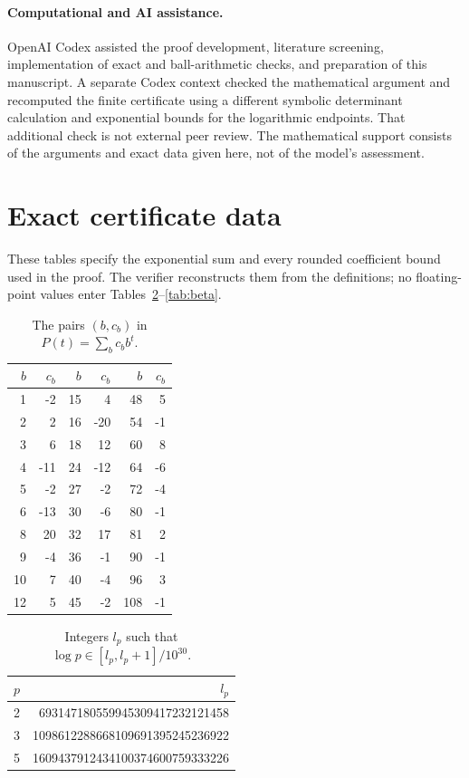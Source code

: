 \documentclass[11pt]{article}
\begin{document}
\paragraph{Computational and AI assistance.}
OpenAI Codex assisted the proof development, literature screening,
implementation of exact and ball-arithmetic checks, and preparation of
this manuscript. A separate Codex context checked the mathematical
argument and recomputed the finite certificate using a different
symbolic determinant calculation and exponential bounds for the
logarithmic endpoints. That additional check is not external peer
review. The mathematical support consists of the arguments and exact
data given here, not of the model's assessment.

\appendix
\section{Exact certificate data}\label{app:data}

These tables specify the exponential sum and every rounded coefficient
bound used in the proof. The verifier reconstructs them from the
definitions; no floating-point values enter Tables~\ref{tab:logs}--\ref{tab:beta}.
\begin{table}[htbp]
\centering
\small
\caption{The pairs $(b,c_b)$ in $P(t)=\sum_b c_b b^t$.}\label{tab:terms}
\begin{tabular}{rr@{\qquad}rr@{\qquad}rr}
\toprule
$b$ & $c_b$ & $b$ & $c_b$ & $b$ & $c_b$ \\
\midrule
1 & -2 & 15 & 4 & 48 & 5 \\
2 & 2 & 16 & -20 & 54 & -1 \\
3 & 6 & 18 & 12 & 60 & 8 \\
4 & -11 & 24 & -12 & 64 & -6 \\
5 & -2 & 27 & -2 & 72 & -4 \\
6 & -13 & 30 & -6 & 80 & -1 \\
8 & 20 & 32 & 17 & 81 & 2 \\
9 & -4 & 36 & -1 & 90 & -1 \\
10 & 7 & 40 & -4 & 96 & 3 \\
12 & 5 & 45 & -2 & 108 & -1 \\
\bottomrule
\end{tabular}
\end{table}

\begin{table}[htbp]
\centering
\small
\caption{Integers $l_p$ such that $\log p\in[l_p,l_p+1]/10^{30}$.}\label{tab:logs}
\begin{tabular}{rr}
\toprule
$p$ & $l_p$ \\
\midrule
2 & 693147180559945309417232121458 \\
3 & 1098612288668109691395245236922 \\
5 & 1609437912434100374600759333226 \\
\bottomrule
\end{tabular}
\end{table}
\end{document}
